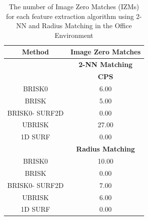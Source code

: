 \begin{table}
\centering
\caption{The number of Image Zero Matches (IZMs) for each feature extraction
algorithm using 2-NN and Radius Matching in the Office Environment}
\begin{tabular}{|c|c|}
\hline 
\textbf{Method} & \multicolumn{1}{c|}{\textbf{Image Zero Matches}}\tabularnewline
\hline 
 & \multicolumn{1}{c|}{\textbf{2-NN Matching}}\tabularnewline
\hline 
 & \textbf{CPS}\tabularnewline
\hline 
\hline 
BRISK0 & 6.00\tabularnewline
\hline 
BRISK & 5.00\tabularnewline
\hline 
BRISK0- SURF2D & 0.00\tabularnewline
\hline 
UBRISK & 27.00\tabularnewline
\hline 
1D SURF & 0.00\tabularnewline
\hline 
 & \multicolumn{1}{c|}{\textbf{Radius Matching}}\tabularnewline
\hline 
BRISK0 & 10.00\tabularnewline
\hline 
BRISK & 0.00\tabularnewline
\hline 
BRISK0- SURF2D & 7.00\tabularnewline
\hline 
UBRISK & 6.00\tabularnewline
\hline 
1D SURF & 0.00\tabularnewline
\hline 
\end{tabular}
\label{app:oe_izm}
\end{table}

